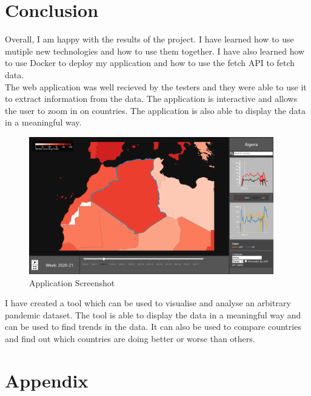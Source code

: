 \documentclass{report}
\begin{document}
\newpage

\chapter{Conclusion}
Overall, I am happy with the results of the project. I have learned how to use mutiple new technologies and how to use them together. I have also learned how to use Docker to deploy my application and how to use the fetch API to fetch data.\\

The web application was well recieved by the testers and they were able to use it to extract information from the data. The application is interactive and allows the user to zoom in on countries. The application is also able to display the data in a meaningful way.

\begin{center}
    \begin{figure}[h]
        \centering
        \includegraphics[width=0.95\textwidth]{Images/dashboard.png}
        \caption{Application Screenshot}
        \label{fig:dashboard-conc}
    \end{figure}
\end{center}
I have created a tool which can be used to visualise and analyse an arbitrary pandemic dataset. The tool is able to display the data in a meaningful way and can be used to find trends in the data. It can also be used to compare countries and find out which countries are doing better or worse than others.\\
\newpage



\newpage

\chapter{Appendix}
\end{document}
